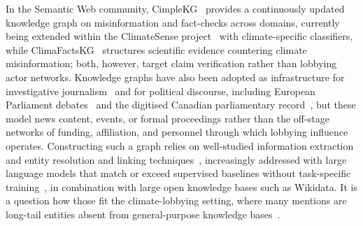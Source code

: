 In the Semantic Web community, CimpleKG~\cite{burel2024cimplekg} provides a continuously updated knowledge graph on misinformation and fact-checks across domains, currently being extended within the ClimateSense project~\cite{climatesense} with climate-specific classifiers, while ClimaFactsKG~\cite{burel2025climafactskg} structures scientific evidence countering climate misinformation; both, however, target claim verification rather than lobbying actor networks.
Knowledge graphs have also been adopted as infrastructure for investigative journalism~\cite{opdahl2022semantic,gallofre2022jkp,berven2020kg,alexander2023manifesto,motta2025epistemology} and for political discourse, including European Parliament debates~\cite{van2016debates} and the digitised Canadian parliamentary record~\cite{beelen2017digitization}, but these model news content, events, or formal proceedings rather than the off-stage networks of funding, affiliation, and personnel through which lobbying influence operates.
Constructing such a graph relies on well-studied information extraction and entity resolution and linking techniques~\cite{christophides2020er,sevgili2022neural,ayoola2022refined}, increasingly addressed with large language models that match or exceed supervised baselines without task-specific training~\cite{peeters2025llmem}, in combination with large open knowledge bases such as Wikidata. 
It is a question how those fit the climate-lobbying setting, where many mentions are long-tail entities absent from general-purpose knowledge bases~\cite{graciotti2025lost}.
